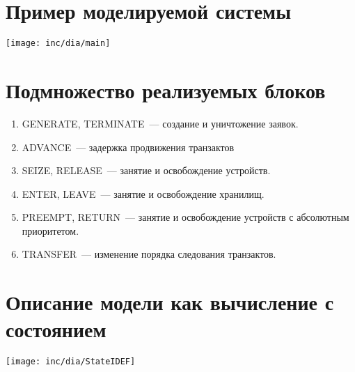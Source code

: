 \documentclass[12pt]{article}
\begin{document}




\section{Пример моделируемой системы}

\texttt{[image: inc/dia/main]}


\section{Подмножество реализуемых блоков}

\begin{enumerate}
\item GENERATE, TERMINATE~--- создание и уничтожение заявок.
\item ADVANCE~--- задержка продвижения транзактов
\item SEIZE, RELEASE~--- занятие и освобождение устройств.
\item ENTER, LEAVE~--- занятие и освобождение хранилищ.
\item PREEMPT, RETURN~--- занятие и освобождение устройств с абсолютным приоритетом.
\item TRANSFER~--- изменение порядка следования транзактов.
\end{enumerate}

\section{Описание модели как вычисление с состоянием}

\texttt{[image: inc/dia/StateIDEF]}
\end{document}

